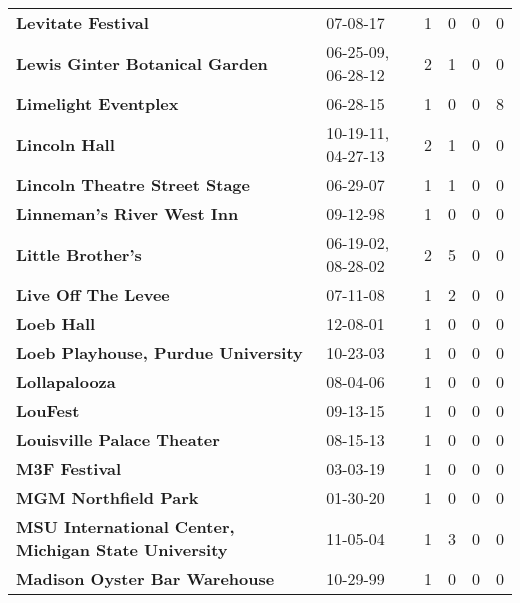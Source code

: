 \begin{supertabular}{p{0.4\textwidth}p{0.3\textwidth}p{0.05\textwidth}p{0.05\textwidth}p{0.05\textwidth}p{0.05\textwidth}}
                                           \textbf{Levitate Festival} &            07-08-17 &  1 &  0 &  0 &  0 \\
                               \textbf{Lewis Ginter Botanical Garden} &  06-25-09, 06-28-12 &  2 &  1 &  0 &  0 \\
                                         \textbf{Limelight Eventplex} &            06-28-15 &  1 &  0 &  0 &  8 \\
                                                \textbf{Lincoln Hall} &  10-19-11, 04-27-13 &  2 &  1 &  0 &  0 \\
                                \textbf{Lincoln Theatre Street Stage} &            06-29-07 &  1 &  1 &  0 &  0 \\
                                   \textbf{Linneman's River West Inn} &            09-12-98 &  1 &  0 &  0 &  0 \\
                                            \textbf{Little Brother's} &  06-19-02, 08-28-02 &  2 &  5 &  0 &  0 \\
                                          \textbf{Live Off The Levee} &            07-11-08 &  1 &  2 &  0 &  0 \\
                                                   \textbf{Loeb Hall} &            12-08-01 &  1 &  0 &  0 &  0 \\
                           \textbf{Loeb Playhouse, Purdue University} &            10-23-03 &  1 &  0 &  0 &  0 \\
                                                \textbf{Lollapalooza} &            08-04-06 &  1 &  0 &  0 &  0 \\
                                                     \textbf{LouFest} &            09-13-15 &  1 &  0 &  0 &  0 \\
                                   \textbf{Louisville Palace Theater} &            08-15-13 &  1 &  0 &  0 &  0 \\
                                                \textbf{M3F Festival} &            03-03-19 &  1 &  0 &  0 &  0 \\
                                         \textbf{MGM Northfield Park} &            01-30-20 &  1 &  0 &  0 &  0 \\
         \textbf{MSU International Center, Michigan State University} &            11-05-04 &  1 &  3 &  0 &  0 \\
                                \textbf{Madison Oyster Bar Warehouse} &            10-29-99 &  1 &  0 &  0 &  0 \\

\end{supertabular}
